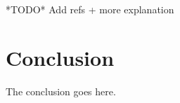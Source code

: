 \documentclass[journal]{IEEEtran}
\begin{document}
  
 
  
*TODO* Add refs + more explanation


\section{Conclusion}
The conclusion goes here.







\end{document}
